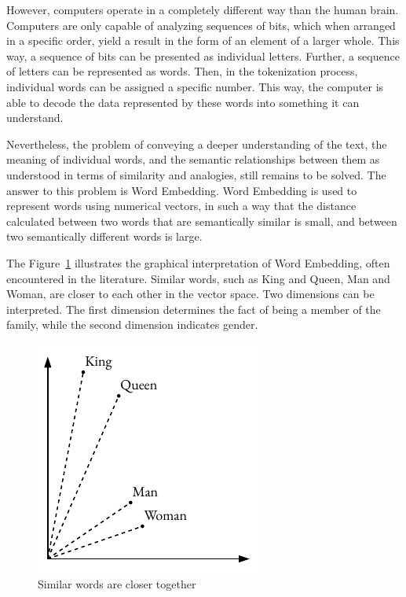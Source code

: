 However, computers operate in a completely different way than the human brain. Computers are only capable of analyzing sequences of bits, which when arranged in a specific order, yield a result in the form of an element of a larger whole. This way, a sequence of bits can be presented as individual letters. Further, a sequence of letters can be represented as words. Then, in the tokenization process, individual words can be assigned a specific number. This way, the computer is able to decode the data represented by these words into something it can understand.

Nevertheless, the problem of conveying a deeper understanding of the text, the meaning of individual words, and the semantic relationships between them as understood in terms of similarity and analogies, still remains to be solved. The answer to this problem is Word Embedding. Word Embedding is used to represent words using numerical vectors, in such a way that the distance calculated between two words that are semantically similar is small, and between two semantically different words is large.

The Figure~\ref{embedding_example} illustrates the graphical interpretation of Word Embedding, often encountered in the literature. Similar words, such as King and Queen, Man and Woman, are closer to each other in the vector space. Two dimensions can be interpreted. The first dimension determines the fact of being a member of the family, while the second dimension indicates gender.

\begin{figure}[hbt!]
\centering
\includegraphics[width=0.6\linewidth]{embedding_example.pdf}
\caption{Similar words are closer together}
\label{embedding_example}
\end{figure}

